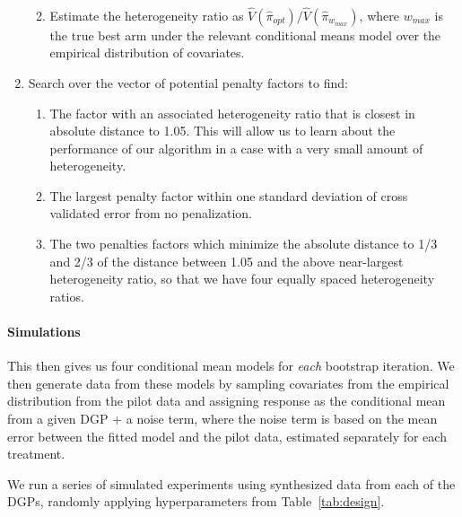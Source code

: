 \documentclass[letterpaper, 12pt, parskip=full,DIV=10]{scrartcl}
\begin{document}
\begin{enumerate}
\begin{enumerate}
\begin{align}
          \end{align}
  \item Estimate the heterogeneity ratio as $\hat{V}(\hat{\pi}_{opt})/\hat{V}(\hat{\pi}_{w_{max}})$, where $w_{max}$ is the true best arm under the relevant conditional means model over the empirical distribution of covariates. 
\end{enumerate}
\item Search over the vector of potential penalty factors to find:
\begin{enumerate}
\item The factor with an associated heterogeneity ratio that is closest in absolute distance to 1.05. This will allow us to learn about the performance of our algorithm in a case with a very small amount of heterogeneity. 
\item The largest penalty factor within one standard deviation of cross validated error from no penalization. 
\item The two penalties factors which minimize the absolute distance to 1/3 and 2/3 of the distance between 1.05 and the above near-largest heterogeneity ratio, so that we have four equally spaced heterogeneity ratios. 
\end{enumerate}
\end{enumerate}

\paragraph{Simulations}
This then gives us four conditional mean models for \textit{each} bootstrap iteration. We then generate data from these models by sampling covariates from the empirical distribution from the pilot data and assigning response as the conditional mean from a given DGP + a noise term, where the noise term is based on the mean error between the fitted model and the pilot data, estimated separately for each treatment. 

We run a series of simulated experiments using synthesized data from each of the DGPs, randomly applying hyperparameters from Table~\ref{tab:design}. 
\end{document}
